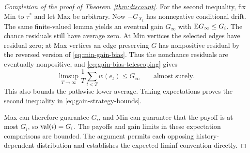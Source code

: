 \begin{proof}[Completion of the proof of Theorem~\ref{thm:discount}]
For the second inequality, fix Min to $\tau^*$ and let Max be arbitrary.
Now $-G_{X_t}$ has nonnegative conditional drift. The same finite-valued
lemma yields an eventual gain $G_\infty$ with $\mathbb E G_\infty\le G_i$.
The chance residuals still have average zero. At Min vertices the
selected edges have residual zero; at Max vertices an edge preserving
$G$ has nonpositive residual by the reversed version of
\eqref{eq:min-gain-bias}. Thus the nonchance residuals are eventually
nonpositive, and \eqref{eq:gain-bias-telescoping} gives
\[
             \limsup_{T\to\infty}\frac1T\sum_{t<T}w(e_t)
                    \le G_\infty
                    \qquad\text{almost surely}.
\]
This also bounds the pathwise lower average. Taking expectations proves
the second inequality in \eqref{eq:gain-strategy-bounds}.

Max can therefore guarantee $G_i$, and Min can guarantee that the payoff
is at most $G_i$, so $\operatorname{val}(i)=G_i$. The payoffs and gain limits in these
expectation comparisons are bounded. The argument permits each opposing
history-dependent distribution and establishes the expected-liminf
convention directly.
\end{proof}
